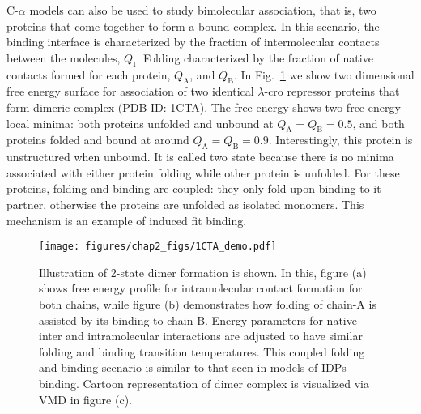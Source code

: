 \documentclass[../talant.diss.submit.tex]{subfiles}
\begin{document}
C-$\alpha$ models can also be used to study bimolecular association, that is,
two proteins that come together to form a bound complex.  In this scenario, the
binding interface is characterized by the fraction of intermolecular contacts
between the molecules, $Q_{\mathrm{I}}$.  Folding characterized by the fraction
of native contacts formed for each protein, $Q_{\mathrm{A}}$, and
$Q_{\mathrm{B}}$.  In Fig.~\ref{fig:1CTA_demo} we show two dimensional free
energy surface for association of two identical $\lambda$-cro repressor
proteins that form dimeric complex (PDB ID: 1CTA).
The free energy shows two free energy local
minima: both proteins unfolded and unbound at $Q_{\mathrm{A}} = Q_{\mathrm{B}}=0.5$, and
both proteins folded and bound at around $Q_{\mathrm{A}} = Q_{\mathrm{B}}=0.9$.
Interestingly, this protein is unstructured when unbound.  It is called two state because there is no
minima associated with either protein folding while other protein is unfolded.
For these proteins, folding and binding are coupled: they
only fold upon binding to it partner, otherwise the proteins are unfolded as isolated monomers.
This mechanism is an example of induced fit binding.

\begin{figure}[htp!]
  \begin{centering}
    \texttt{[image: figures/chap2\_figs/1CTA\_demo.pdf]}
    \caption{Illustration of 2-state dimer
      formation is shown.
      In this, figure (a) shows free energy profile for intramolecular contact formation
      for both chains, while figure (b) demonstrates how folding of chain-A is assisted
      by its binding to chain-B. Energy parameters for native
      inter and intramolecular interactions are adjusted to have similar folding
      and binding transition temperatures.
      This coupled folding and binding scenario is similar to that seen in models of IDPs binding. 
      Cartoon representation of dimer complex is
      visualized via VMD in figure (c).}
    \label{fig:1CTA_demo}
  \end{centering}
\end{figure}
\end{document}
